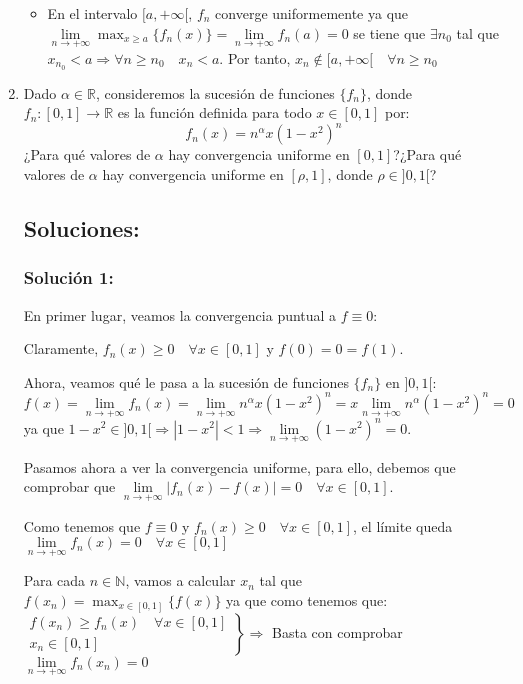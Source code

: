\documentclass[a4paper, 11pt]{article} %
\begin{document}
\begin{enumerate}
\begin{itemize}
  			\item En el intervalo $[a,+\infty[$, $f_n$ converge uniformemente ya que \\
  			$\displaystyle{\lim\limits_{n \rightarrow +\infty} \max_{x \geq a}\{f_n(x)\}
  			= \lim\limits_{n \rightarrow +\infty} f_n(a)} = 0$ se tiene que $\exists
  			n_0$ tal que $x_{n_0} < a \Rightarrow \forall n \geq n_0 \quad x_n < a$.
  			Por tanto, $x_n \notin [a,+\infty[ \quad \forall n \geq n_0$
  		\end{itemize}
  		
	\item Dado $\alpha \in \mathbb{R}$, consideremos la sucesión de funciones $\{f_n\}$, donde\\ %
	$f_n: [0,1] \rightarrow \mathbb{R}$ es la función definida para todo $x \in [0,1]$ por:
	$$f_n(x) = n^\alpha x(1-x^2)^n$$ 
	¿Para qué valores de $\alpha$ hay convergencia uniforme en $[0,1]$?¿Para qué valores de
	$\alpha$ hay convergencia uniforme en $[\rho,1]$, donde $\rho \in ]0,1[$?
	\subsection*{Soluciones:}
		\subsubsection*{Solución 1:}
		En primer lugar, veamos la convergencia puntual a $f \equiv 0$:
		
		Claramente, $f_n(x) \geq 0 \quad \forall x \in [0,1]$ y $f(0) = 0 = f(1)$.
		
		Ahora, veamos qué le pasa a la sucesión de funciones $\{f_n\}$ en $]0,1[:$
		$$f(x) = \lim\limits_{n \rightarrow +\infty} f_n(x) =
		\lim\limits_{n \rightarrow +\infty} n^\alpha x(1-x^2)^n =
		x \lim\limits_{n \rightarrow +\infty} n^\alpha (1-x^2)^n = 0$$
		ya que $1-x^2 \in ]0,1[ \Rightarrow |1-x^2| < 1 \Rightarrow 
		\displaystyle{\lim\limits_{n \rightarrow +\infty} (1-x^2)^n} = 0.$
			
		Pasamos ahora a ver la convergencia uniforme, para ello, debemos que comprobar que
  		$\lim\limits_{n \rightarrow +\infty} |f_n(x)-f(x)| = 0 \quad \forall x \in [0,1]$.
  		
  		Como tenemos que $f \equiv 0$ y $f_n(x) \geq 0 \quad \forall x \in [0,1]$,
  		el límite queda $\lim\limits_{n \rightarrow +\infty} f_n(x) = 0 \quad \forall x \in [0,1]$
  		
  		Para cada $n \in \mathbb{N}$, vamos a calcular $x_n$ tal que $\displaystyle{f(x_n) =
  		\max_{x \in	[0,1]}\{f(x)\}}$ ya que como tenemos que:
  		$ \left. \begin{array}{c}
  			f(x_n) \geq f_n(x) \quad \forall x \in [0,1]\\
  			x_n \in [0,1]
   		\end{array} \right\}
   		\Rightarrow$ Basta con comprobar $\lim\limits_{n \rightarrow +\infty} f_n(x_n) = 0$


\end{enumerate}
\end{document}
